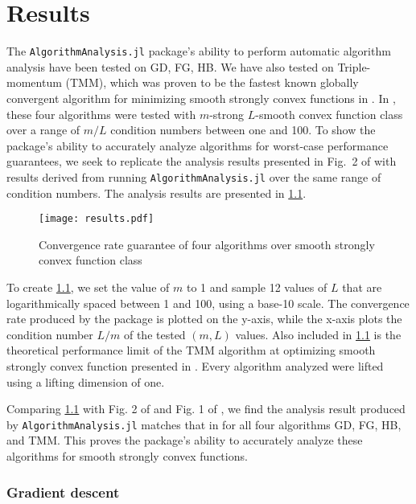 \chapter{Results}\label{chapter:results}

The \texttt{AlgorithmAnalysis.jl} package's ability to perform automatic algorithm analysis have been tested on GD, FG, HB. We have also tested on Triple-momentum (TMM), which was proven to be the fastest known globally convergent algorithm for minimizing smooth strongly convex functions in \cite{TMM}. In \cite{tutorial}, these four algorithms were tested with $m$-strong $L$-smooth convex function class over a range of $m/L$ condition numbers between one and 100. To show the package's ability to accurately analyze algorithms for worst-case performance guarantees, we seek to replicate the analysis results presented in Fig.~2 of \cite{tutorial} with results derived from running \texttt{AlgorithmAnalysis.jl} over the same range of condition numbers. The analysis results are presented in \cref{4_results}.

\begin{figure}[h]
    \centering
    \texttt{[image: results.pdf]}
    \caption{Convergence rate guarantee of four algorithms over smooth strongly convex function class}
    \label{4_results}
\end{figure}

To create \cref{4_results}, we set the value of $m$ to 1 and sample 12 values of $L$ that are logarithmically spaced between 1 and 100, using a base-10 scale. The convergence rate produced by the package is plotted on the y-axis, while the x-axis plots the condition number $L/m$ of the tested $(m,L)$ values. Also included in \cref{4_results} is the theoretical performance limit of the TMM algorithm at optimizing smooth strongly convex function presented in \cite{TMM}. Every algorithm analyzed were lifted using a lifting dimension of one.

Comparing \cref{4_results} with Fig. 2 of \cite{tutorial} and Fig. 1 of \cite{TMM}, we find the analysis result produced by \texttt{AlgorithmAnalysis.jl} matches that in \cite{tutorial} for all four algorithms GD, FG, HB, and TMM. This proves the package's ability to accurately analyze these algorithms for smooth strongly convex functions.

\subsection*{Gradient descent}

